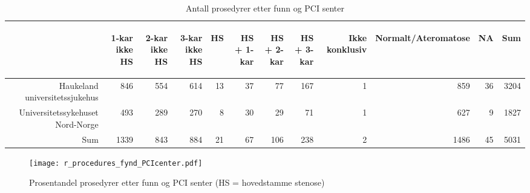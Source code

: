 \documentclass[norsk, a4paper]{report}
\begin{document}
\begin{tiny}
\begin{table}[ht]
\centering
\begin{tabular}{rrrrrrrrrrrr}
  \toprule
 & \begin{sideways} 1-kar ikke HS \end{sideways} & \begin{sideways} 2-kar ikke HS \end{sideways} & \begin{sideways} 3-kar ikke HS \end{sideways} & \begin{sideways} HS \end{sideways} & \begin{sideways} HS + 1-kar \end{sideways} & \begin{sideways} HS + 2-kar \end{sideways} & \begin{sideways} HS + 3-kar \end{sideways} & \begin{sideways} Ikke konklusiv \end{sideways} & \begin{sideways} Normalt/Ateromatose \end{sideways} & \begin{sideways} NA \end{sideways} & \begin{sideways} Sum \end{sideways} \\ 
  \midrule
Haukeland universitetssjukehus & 846 & 554 & 614 & 13 & 37 & 77 & 167 & 1 & 859 & 36 & 3204 \\ 
  Universitetssykehuset Nord-Norge & 493 & 289 & 270 & 8 & 30 & 29 & 71 & 1 & 627 & 9 & 1827 \\ 
  Sum & 1339 & 843 & 884 & 21 & 67 & 106 & 238 & 2 & 1486 & 45 & 5031 \\ 
   \bottomrule
\end{tabular}
\caption{Antall prosedyrer etter funn og PCI senter} 
\end{table}\end{tiny}

\clearpage



\begin{figure}[ht]
  \centering
\texttt{[image: r\_procedures\_fynd\_PCIcenter.pdf]}  \caption{Prosentandel prosedyrer etter funn og PCI senter (HS = hovedstamme stenose)}
\end{figure}
\end{document}

